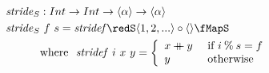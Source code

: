 \documentclass[preview]{standalone}
\begin{document}
\begin{align*}
  \mathit{stride}_S &: Int \rightarrow Int \rightarrow \vect{\alpha} \rightarrow \vect{\alpha} \\
  \mathit{stride}_S &\ f\ s = \mathit{stridef} \redS \vect{1,2,...} \circ \vect{} \fMapS\\
         & \text{where}\ \ \mathit{stridef}\ i\ x\ y = 
           \left\{\begin{array}{ll}
                    x \fcat y & \text{ if } i \mathbin{\%} s = f\\
                     y & \text{ otherwise}
                  \end{array}
           \right.\\
\end{align*}
\end{document}
